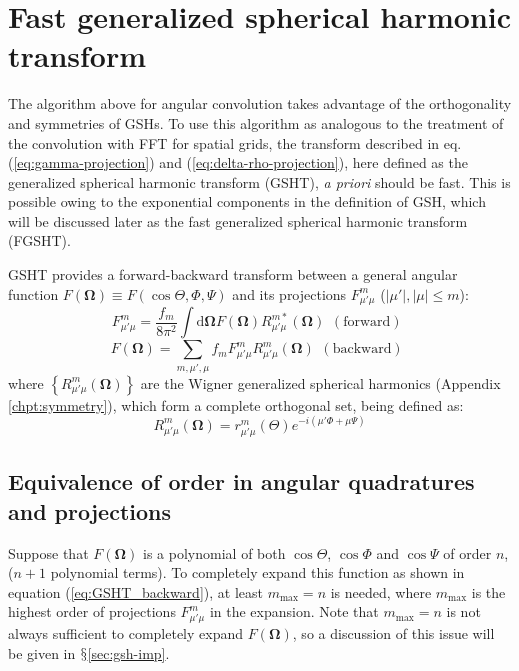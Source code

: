 \section{Fast generalized spherical harmonic transform\label{sec:fgsht}}

The algorithm above for angular convolution takes advantage of the
orthogonality and symmetries of \acs{GSH}s. To use this algorithm
as analogous to the treatment of the convolution with \acs{FFT} for
spatial grids, the transform described in eq. (\ref{eq:gamma-projection})
and (\ref{eq:delta-rho-projection}), here defined as the generalized
spherical harmonic transform (\acs{GSHT}), \textit{a priori }should
be fast. This is possible owing to the exponential components in the
definition of \acs{GSH}, which will be discussed later as the fast
generalized spherical harmonic transform (\acs{FGSHT}).

\acs{GSHT} provides a forward-backward transform between a general
angular function $F(\mathbf{\Omega})\equiv F(\cos\Theta,\Phi,\Psi)$
and its projections $F_{\mu'\mu}^{m}$ ($\left|\mu'\right|,\left|\mu\right|\leq m$):
\begin{equation}
F_{\mu'\mu}^{m}=\frac{f_{m}}{8\pi^{2}}\int\mathrm{d}\mathbf{\Omega}F(\mathbf{\Omega})R_{\mu'\mu}^{m*}(\mathbf{\Omega})\begin{array}{c}
\mathrm{(forward)}\end{array}\label{eq:GSHT_forward}
\end{equation}
\begin{equation}
F(\mathbf{\Omega})=\sum_{m,\mu',\mu}f_{m}F_{\mu'\mu}^{m}R_{\mu'\mu}^{m}(\mathbf{\Omega})\begin{array}{c}
\mathrm{(backward)}\end{array}\label{eq:GSHT_backward}
\end{equation}
where $\left\{ R_{\mu'\mu}^{m}(\mathbf{\Omega})\right\} $ are the
Wigner generalized spherical harmonics (Appendix \ref{chpt:symmetry}),
which form a complete orthogonal set, being defined as:
\begin{equation}
R_{\mu'\mu}^{m}(\mathbf{\Omega})=r_{\mu'\mu}^{m}(\Theta)e^{-i(\mu'\Phi+\mu\Psi)}
\end{equation}


\subsection{Equivalence of order in angular quadratures and projections}

Suppose that $F(\mathbf{\Omega})$ is a polynomial of both $\cos\Theta$,
$\cos\Phi$ and $\cos\Psi$ of order $n$, ($n+1$ polynomial terms).
To completely expand this function as shown in equation (\ref{eq:GSHT_backward}),
at least $m_{\mathrm{max}}=n$ is needed, where $m_{\mathrm{max}}$
is the highest order of projections $F_{\mu'\mu}^{m}$ in the expansion.
Note that $m_{\mathrm{max}}=n$ is not always sufficient to completely
expand $F(\mathbf{\Omega})$, so a discussion of this issue will be given
in $\mathsection$\ref{sec:gsh-imp}. 

